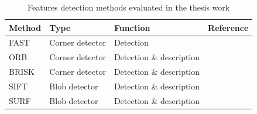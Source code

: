 \begin{table}[!h]
    \centering
    \begin{tabular}{p{2cm} p{3.5cm} p{5cm} l}
        Method & Type & Function & Reference \\\hline \hline
        FAST & Corner detector & Detection & \cite{rosten2005fusing} \\\hline
        ORB & Corner detector & Detection \& description & \cite{rublee2011orb}\\\hline
        BRISK & Corner detector & Detection \& description & \cite{leutenegger2011brisk}\\\hline
        SIFT & Blob detector & Detection \& description & \cite{lowe2004sift}\\\hline
        SURF & Blob detector & Detection \& description & \cite{bay2006surf}\\ \hline
         
    \end{tabular}
    \caption{Features detection methods evaluated in the thesis work}
    \label{tab:dectmeth}
\end{table}


